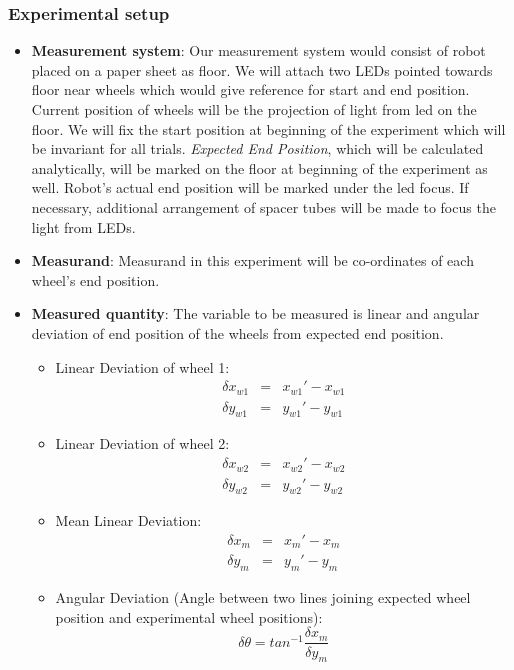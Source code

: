 \subsubsection*{Experimental setup}
\begin{itemize}
\item \textbf{Measurement system}: Our measurement system would consist of robot placed on a paper sheet as floor. We will attach two LEDs pointed towards floor near wheels which would give reference for start and end position. Current position of wheels will be the projection of light from led on the floor. We will fix the start position at beginning of the experiment which will be invariant for all trials. \textit{Expected End Position}, which will be calculated analytically, will be marked on the floor at beginning of the experiment as well. Robot's actual end position will be marked under the led focus. If necessary, additional arrangement of spacer tubes will be made to focus the light from LEDs. 

\item \textbf{Measurand}: Measurand in this experiment will be co-ordinates of each wheel's end position. 

\item \textbf{Measured quantity}: The variable to be measured is linear and angular deviation of end position of the wheels from expected end position. 
\begin{itemize}
	\item Linear Deviation of wheel 1:
	\begin{equation}
	\begin{array}{rcl}
	\delta x_{w1} &=& x_{w1}' - x_{w1} \\
	\delta y_{w1} &=& y_{w1}' - y_{w1}
	\end{array}
	\end{equation}

	\item Linear Deviation of wheel 2:
	\begin{equation}
	\begin{array}{rcl}
	\delta x_{w2} &=& x_{w2}' - x_{w2}\\
	\delta y_{w2} &=& y_{w2}' - y_{w2}
	\end{array}
	\end{equation}
	
	\item Mean Linear Deviation:
	\begin{equation}
	\begin{array}{rcl}
	\delta x_{m} &=& x_{m}' - x_{m} \\
	\delta y_{m} &=& y_{m}' - y_{m}
	\end{array}
	\label{mean-linear-deviation}
	\end{equation}
	
	\item Angular Deviation (Angle between two lines joining expected wheel position and experimental wheel positions):
	\begin{equation}
	\delta \theta = tan^{-1}\frac{\delta x_{m}}{\delta y_{m}}
	\label{angular-dev}
	\end{equation}
\end{itemize}
\end{itemize}

